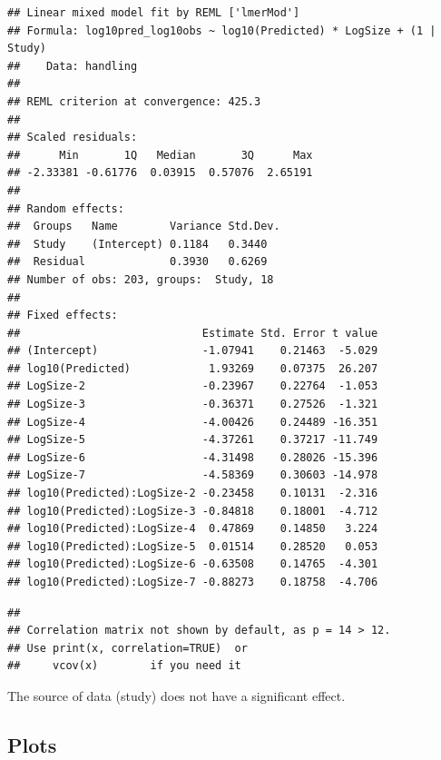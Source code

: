 \begin{verbatim}
## Linear mixed model fit by REML ['lmerMod']
## Formula: log10pred_log10obs ~ log10(Predicted) * LogSize + (1 | Study)
##    Data: handling
## 
## REML criterion at convergence: 425.3
## 
## Scaled residuals: 
##      Min       1Q   Median       3Q      Max 
## -2.33381 -0.61776  0.03915  0.57076  2.65191 
## 
## Random effects:
##  Groups   Name        Variance Std.Dev.
##  Study    (Intercept) 0.1184   0.3440  
##  Residual             0.3930   0.6269  
## Number of obs: 203, groups:  Study, 18
## 
## Fixed effects:
##                            Estimate Std. Error t value
## (Intercept)                -1.07941    0.21463  -5.029
## log10(Predicted)            1.93269    0.07375  26.207
## LogSize-2                  -0.23967    0.22764  -1.053
## LogSize-3                  -0.36371    0.27526  -1.321
## LogSize-4                  -4.00426    0.24489 -16.351
## LogSize-5                  -4.37261    0.37217 -11.749
## LogSize-6                  -4.31498    0.28026 -15.396
## LogSize-7                  -4.58369    0.30603 -14.978
## log10(Predicted):LogSize-2 -0.23458    0.10131  -2.316
## log10(Predicted):LogSize-3 -0.84818    0.18001  -4.712
## log10(Predicted):LogSize-4  0.47869    0.14850   3.224
## log10(Predicted):LogSize-5  0.01514    0.28520   0.053
## log10(Predicted):LogSize-6 -0.63508    0.14765  -4.301
## log10(Predicted):LogSize-7 -0.88273    0.18758  -4.706
\end{verbatim}

\begin{verbatim}
## 
## Correlation matrix not shown by default, as p = 14 > 12.
## Use print(x, correlation=TRUE)  or
##     vcov(x)        if you need it
\end{verbatim}

The source of data (study) does not have a significant effect.

\hypertarget{plots}{%
\subsection{Plots}\label{plots}}

